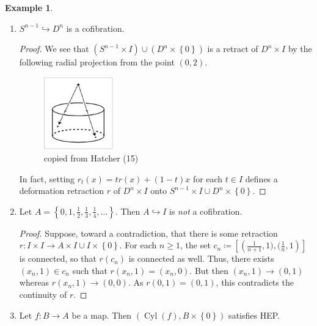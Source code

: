\documentclass[10pt,letterpaper,cm]{nupset}
\theoremstyle{definition}
\newtheorem{exmp}[definition]{Example}
\theoremstyle{theorem}
\theoremstyle{remark}
\newcommand{\1}{\mathbb{1}}
\newcommand{\0}{\vec 0}
\DeclareMathOperator{\cyl}{Cyl}
\begin{document}
\begin{exmp}\label{ex12} $ $
\begin{enumerate}[label=(\alph*)]
\item $S^{n-1} \hookrightarrow D^n$ is a cofibration. 
\begin{proof}
We see that $\left(S^{n-1} \times I\right) \cup \left(D^n \times \left\{0\right\}\right)$ is a retract of $D^n \times I$ by the following radial projection from the point $\left(0,2\right)$.
\begin{figure}[H]
\centering
\includegraphics[width=30mm]{Hatcher-radial_proj.png}
\caption{copied from Hatcher (15) \label{overflow}}
\end{figure} In fact, setting $r_t(x) = tr(x) +(1-t)x$ for each $t\in I$ defines a deformation retraction $r$ of $D^n \times I$ onto $S^{n-1} \times I \cup D^n \times \left\{0\right\}$.
\end{proof}
\item Let $A= \left\{0, 1, \frac{1}{2}, \frac{1}{3}, \frac{1}{4}, \ldots\right\}$. Then $A \hookrightarrow I$ is \emph{not} a cofibration.
\begin{proof}
Suppose, toward a contradiction, that there is some retraction $r: I \times I \to A \times I \cup I \times \left\{0\right\}$. For each $n\geq 1$, the set $c_n \coloneqq  \left[\left(\frac{1}{n+1}, 1), (\frac{1}{n}, 1\right)\right]$ is connected, so that $r(c_n)$ is connected as well. Thus, there exists $\left(x_n, 1\right) \in c_n$ such that $r(x_n, 1) = \left(x_n ,0\right)$. But then $\left(x_n, 1\right) \to \left(0, 1\right)$ whereas $r(x_n, 1) \to \left(0, 0\right)$. As $r(0,1) = \left(0,1\right)$, this contradicts the continuity of $r$. 
\end{proof}
\item Let $f: B \to A$ be a map. Then $\left(\cyl(f), B \times \left\{0\right\}\right)$ satisfies HEP.
\end{enumerate}
\end{exmp}
\end{document}
